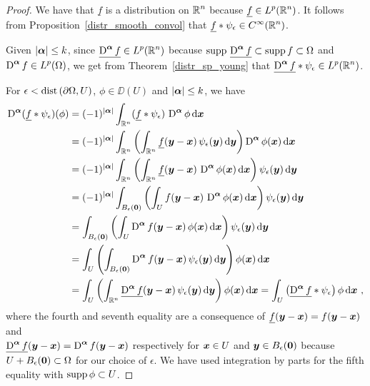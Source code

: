 \begin{proof}
We have that $\underline{f}$ is a distribution on $\displaystyle \mathbb{R}^n$ because
$\displaystyle \underline{f} \in L^p(\mathbb{R}^n)$.
It follows from Proposition~\ref{distr_smooth_convol} that 
$\displaystyle \underline{f} \ast \psi_{\epsilon} \in C^\infty(\mathbb{R}^n)$.

Given $|{\bm{\alpha}}|\leq k$, since
$\displaystyle \underline{\operatorname{D}^{{\bm{\alpha}}} f} \in L^p(\mathbb{R}^n)$ because
$\displaystyle \operatorname{supp}\, \underline{\operatorname{D}^{{\bm{\alpha}}} f} \subset
\operatorname{supp} f \subset \Omega$ and
$\displaystyle \operatorname{D}^{{\bm{\alpha}}} f \in L^p(\Omega)$, we get from
Theorem~\ref{distr_sp_young} that
$\displaystyle \underline{\operatorname{D}^{{\bm{\alpha}}} f} \ast
\psi_\epsilon \in L^p(\mathbb{R}^n)$.

For $\epsilon < \mathrm{dist}\left(\partial \Omega,U\right)$, $\phi \in \DD(U)$ and
$|{\bm{\alpha}}|\leq k$, we have
\begin{align*}
\operatorname{D}^{{\bm{\alpha}}}(\underline{f} \ast \psi_\epsilon)(\phi)
&= (-1)^{|{\bm{\alpha}}|} \int_{\mathbb{R}^n}
(\underline{f} \ast \psi_\epsilon)\, \operatorname{D}^{{\bm{\alpha}}} \phi \,\mathrm{d}{{\bm{x}}}  \\
&= (-1)^{|{\bm{\alpha}}|} \int_{\mathbb{R}^n}
\left( \int_{\mathbb{R}^n} \underline{f}({\bm{y}}-{\bm{x}})\,
\psi_\epsilon ({\bm{y}}) \,\mathrm{d}{{\bm{y}}} \right) \operatorname{D}^{{\bm{\alpha}}} \phi({\bm{x}})
\,\mathrm{d}{{\bm{x}}} \\
&= (-1)^{|{\bm{\alpha}}|} \int_{\mathbb{R}^n} \left( \int_{\mathbb{R}^n}
\underline{f}({\bm{y}}-{\bm{x}})\, \operatorname{D}^{{\bm{\alpha}}} \phi({\bm{x}}) \,\mathrm{d}{{\bm{x}}}
\right) \psi_\epsilon ({\bm{y}}) \,\mathrm{d}{{\bm{y}}} \\
&= (-1)^{|{\bm{\alpha}}|} \int_{B_\epsilon({\bm{0}})}
\left( \int_{U} f({\bm{y}}-{\bm{x}})\,
\operatorname{D}^{{\bm{\alpha}}} \phi({\bm{x}}) \,\mathrm{d}{{\bm{x}}}
\right) \psi_\epsilon ({\bm{y}}) \,\mathrm{d}{{\bm{y}}} \\
&= \int_{B_\epsilon({\bm{0}})} \left( \int_{U} \operatorname{D}^{{\bm{\alpha}}}
f({\bm{y}}-{\bm{x}})\, \phi({\bm{x}}) \,\mathrm{d}{{\bm{x}}}
\right) \psi_\epsilon ({\bm{y}}) \,\mathrm{d}{{\bm{y}}} \\
&= \int_U \left( \int_{B_\epsilon({\bm{0}})} \operatorname{D}^{{\bm{\alpha}}}
f ({\bm{y}}-{\bm{x}})\,
\psi_\epsilon ({\bm{y}}) \,\mathrm{d}{{\bm{y}}} \right) \phi({\bm{x}}) \,\mathrm{d}{{\bm{x}}} \\
&= \int_U \left( \int_{\mathbb{R}^n} \underline{\operatorname{D}^{{\bm{\alpha}}} f}
({\bm{y}}-{\bm{x}})\,
\psi_\epsilon ({\bm{y}}) \,\mathrm{d}{{\bm{y}}} \right) \phi({\bm{x}}) \,\mathrm{d}{{\bm{x}}}
= \int_{U} \left( \underline{\operatorname{D}^{{\bm{\alpha}}} f} \ast
\psi_\epsilon \right) \phi \,\mathrm{d}{{\bm{x}}} \ ,
\end{align*}
where the fourth and seventh equality are a consequence of
$\displaystyle \underline{f}({\bm{y}} - {\bm{x}}) = f({\bm{y}}-{\bm{x}})$
and\\
$\displaystyle \underline{\operatorname{D}^{{\bm{\alpha}}} f}({\bm{y}} - {\bm{x}})
= \operatorname{D}^{{\bm{\alpha}}} f({\bm{y}}-{\bm{x}})$ respectively 
for ${\bm{x}} \in U$ and ${\bm{y}} \in B_\epsilon({\bm{0}})$ because
$U + B_\epsilon({\bm{0}}) \subset \Omega$ for our choice of $\epsilon$.
We have used integration by parts for the fifth equality with
$\operatorname{supp} \phi \subset U$.


\end{proof}

